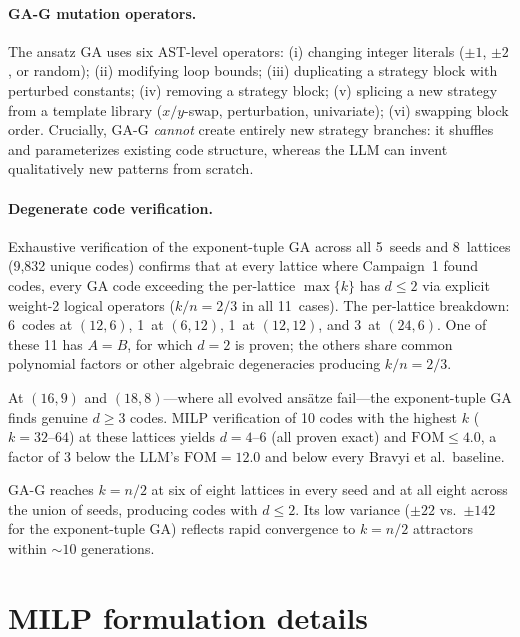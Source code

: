 \documentclass[aps,prxquantum,twocolumn,superscriptaddress,nofootinbib]{revtex4-2}
\newcommand{\FOM}{\ensuremath{\mathrm{FOM}}}
\begin{document}
\paragraph{GA-G mutation operators.}
The ansatz GA uses six AST-level operators:
(i) changing integer literals ($\pm 1$, $\pm 2$, or random);
(ii) modifying loop bounds;
(iii) duplicating a strategy block with perturbed constants;
(iv) removing a strategy block;
(v) splicing a new strategy from a template library ($x/y$-swap, perturbation, univariate);
(vi) swapping block order.
Crucially, GA-G \emph{cannot} create entirely new strategy branches: it shuffles and parameterizes existing code structure, whereas the LLM can invent qualitatively new patterns from scratch.

\paragraph{Degenerate code verification.}
Exhaustive verification of the exponent-tuple GA across all 5~seeds and 8~lattices (9{,}832 unique codes) confirms that at every lattice where Campaign~1 found codes, every GA code exceeding the per-lattice $\max\{k\}$ has $d \leq 2$ via explicit weight-2 logical operators ($k/n = 2/3$ in all 11~cases).
The per-lattice breakdown: 6~codes at $(12,6)$, 1~at $(6,12)$, 1~at $(12,12)$, and 3~at $(24,6)$.
One of these 11 has $A = B$, for which $d = 2$ is proven; the others share common polynomial factors or other algebraic degeneracies producing $k/n = 2/3$.

At $(16,9)$ and $(18,8)$---where all evolved ansätze fail---the exponent-tuple GA finds genuine $d \geq 3$ codes.
MILP verification of 10 codes with the highest $k$ ($k = 32$--$64$) at these lattices yields $d = 4$--$6$ (all proven exact) and $\FOM \leq 4.0$, a factor of $3$ below the LLM's $\FOM = 12.0$ and below every Bravyi et al.\ baseline.

GA-G reaches $k = n/2$ at six of eight lattices in every seed and at all eight across the union of seeds, producing codes with $d \leq 2$.
Its low variance ($\pm 22$ vs.\ $\pm 142$ for the exponent-tuple GA) reflects rapid convergence to $k = n/2$ attractors within ${\sim}10$ generations.

\section{MILP formulation details}
\label{sm:milp}
\end{document}

